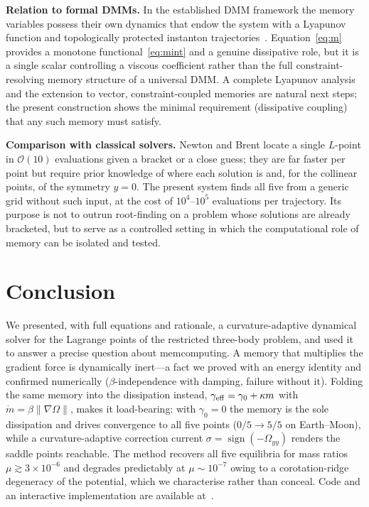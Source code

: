 \documentclass[10pt,twocolumn]{article}
\begin{document}
\textbf{Relation to formal DMMs.} In the established DMM framework the memory
variables possess their own dynamics that endow the system with a Lyapunov
function and topologically protected instanton trajectories~\cite{diventra2022}.
Equation~\eqref{eq:m} provides a monotone functional~\eqref{eq:mint} and a
genuine dissipative role, but it is a single scalar controlling a viscous
coefficient rather than the full constraint-resolving memory structure of a
universal DMM. A complete Lyapunov analysis and the extension to vector,
constraint-coupled memories are natural next steps; the present construction
shows the minimal requirement (dissipative coupling) that any such memory must
satisfy.

\textbf{Comparison with classical solvers.} Newton and Brent locate a single
$L$-point in $\mathcal O(10)$ evaluations given a bracket or a close guess; they
are far faster per point but require prior knowledge of where each solution is
and, for the collinear points, of the symmetry $y=0$. The present system finds
all five from a generic grid without such input, at the cost of $10^4$--$10^5$
evaluations per trajectory. Its purpose is not to outrun root-finding on a
problem whose solutions are already bracketed, but to serve as a controlled
setting in which the computational role of memory can be isolated and tested.

\section{Conclusion}

We presented, with full equations and rationale, a curvature-adaptive
dynamical solver for the Lagrange points of the restricted three-body problem,
and used it to answer a precise question about memcomputing. A memory that
multiplies the gradient force is dynamically inert---a fact we proved with an
energy identity and confirmed numerically ($\beta$-independence with damping,
failure without it). Folding the same memory into the dissipation instead,
$\gamma_{\rm eff}=\gamma_0+\kappa m$ with
$\dot m=\beta\lVert\nabla\Omega\rVert$, makes it load-bearing: with $\gamma_0=0$
the memory is the sole dissipation and drives convergence to all five points
($0/5\to5/5$ on Earth--Moon), while a curvature-adaptive correction current
$\sigma=\operatorname{sign}(-\Omega_{yy})$ renders the saddle points reachable.
The method recovers all five equilibria for mass ratios
$\mu\gtrsim3\times10^{-6}$ and degrades predictably at $\mu\sim10^{-7}$ owing to
a corotation-ridge degeneracy of the potential, which we characterise rather
than conceal. Code and an interactive implementation are available
at~\cite{github2026}.
\end{document}
